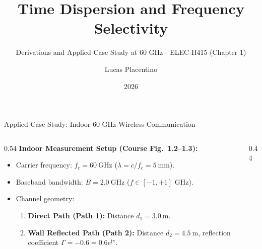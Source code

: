 \documentclass[10pt,aspectratio=169]{beamer}
\title[Time Dispersion \& Frequency Selectivity]{Time Dispersion and Frequency Selectivity}
\subtitle{Derivations and Applied Case Study at 60 GHz - ELEC-H415 (Chapter 1)}
\author[Lucas Placentino]{Lucas Placentino}
\institute[EPB-ULB]{École Polytechnique de Bruxelles - Université Libre de Bruxelles}
\date{2026}
\newcommand{\jj}{\mathrm{j}}
\begin{document}
\begin{frame}
  \titlepage
\end{frame}

\begin{frame}{Applied Case Study: Indoor 60 GHz Wireless Communication}
  \begin{columns}[T]
    \begin{column}{0.54\textwidth}
      \textbf{Indoor Measurement Setup (Course Fig.~1.2--1.3):}
      \begin{itemize}
        \item Carrier frequency: $f_c = \SI{60}{\giga\hertz}$ ($\lambda = c/f_c = \SI{5}{\milli\meter}$).
        \item Baseband bandwidth: $B = \SI{2.0}{\giga\hertz}$ ($f \in [-1, +1]\text{ GHz}$).
        \item Channel geometry:
        \begin{enumerate}
          \item \textbf{Direct Path (Path 1):} Distance $d_1 = \SI{3.0}{\meter}$.
          \item \textbf{Wall Reflected Path (Path 2):} Distance $d_2 = \SI{4.5}{\meter}$, reflection coefficient $\Gamma = -0.6 = 0.6 e^{\jj\pi}$.
        \end{enumerate}
      \end{itemize}
    \end{column}
    \begin{column}{0.44\textwidth}
      \begin{center}
\end{center}
\end{column}
\end{columns}
\end{frame}
\end{document}
